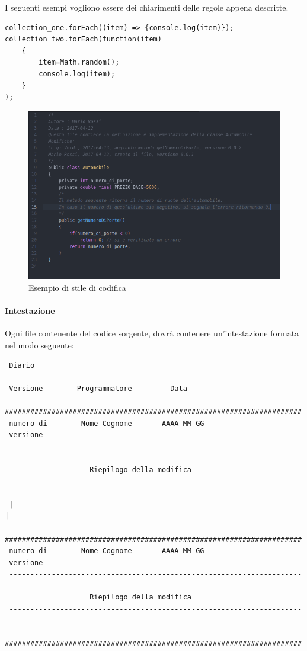 I seguenti esempi vogliono essere dei chiarimenti delle regole appena descritte.
\begin{lstlisting}
collection_one.forEach((item) => {console.log(item)});
collection_two.forEach(function(item)
	{
		item=Math.random();
		console.log(item);
	}
);
\end{lstlisting}
\begin{figure}[h]
	\centering
	\includegraphics[scale=0.35]{img/esempioStileCodifica.png}
	\caption{Esempio di stile di codifica}
\end{figure}
 \newpage
 \paragraph{Intestazione}\label{intestazione}
 Ogni file contenente del codice sorgente, dovrà contenere un'intestazione formata nel modo seguente:
 \begin{lstlisting}
 Diario
 
 Versione        Programmatore         Data
 ######################################################################
 numero di        Nome Cognome       AAAA-MM-GG
 versione
 ----------------------------------------------------------------------
                    Riepilogo della modifica
 ----------------------------------------------------------------------
 |                                                                    |
 ######################################################################
 numero di        Nome Cognome       AAAA-MM-GG
 versione
 ----------------------------------------------------------------------
                    Riepilogo della modifica
 ----------------------------------------------------------------------
 ######################################################################

 \end{lstlisting}
 
